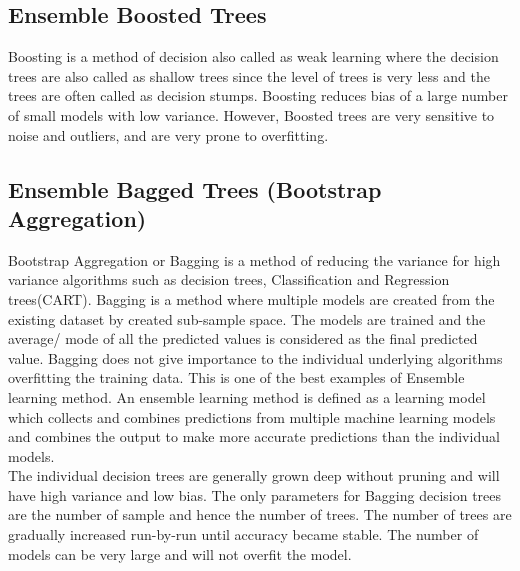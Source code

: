 \documentclass[journal, a4paper]{IEEEtran}
\begin{document}
\subsection{Ensemble Boosted Trees}
Boosting is a method of decision also called as weak learning where the decision trees are also called as shallow trees since the level of trees is very less and the trees are often called as decision stumps. Boosting reduces bias of a large number of small models with low variance. However, Boosted trees are very sensitive to noise and outliers, and are very prone to overfitting.

\subsection{Ensemble Bagged Trees (Bootstrap Aggregation)}
Bootstrap Aggregation or Bagging is a method of reducing the variance for high variance algorithms such as decision trees, Classification and Regression trees(CART). Bagging is a method where multiple models are created from the existing dataset by created sub-sample space. The models are trained and the average/ mode of all the predicted values is considered as the final predicted value. Bagging does not give importance to the individual underlying algorithms overfitting the training data. This is one of the best examples of Ensemble learning method. An ensemble learning method is defined as a learning model which collects and combines predictions from multiple machine learning models and combines the output to make more accurate predictions than the individual models. \\
\indent The individual decision trees are generally grown deep without pruning and will have high variance and low bias. The only parameters for Bagging decision trees are the number of sample and hence the number of trees. The number of trees are gradually increased run-by-run until accuracy became stable. The number of models can be very large and will not overfit the model.
\end{document}
